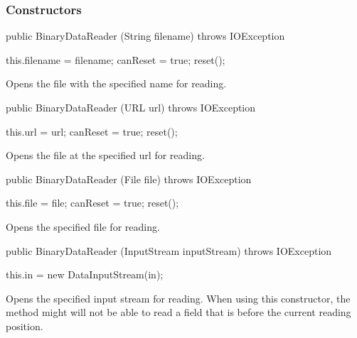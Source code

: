       
\subsubsection*{Constructors}

\begin{code}

   public BinaryDataReader (String filename) throws IOException \begin{hide} {
      this.filename = filename;
      canReset = true;
      reset();
   }
   \end{hide}
\end{code}
\begin{tabb}
Opens the file with the specified name for reading.
\end{tabb}
\begin{htmlonly}
\end{htmlonly}
\begin{code}

   public BinaryDataReader (URL url) throws IOException \begin{hide} {
      this.url = url;
      canReset = true;
      reset();
   }
   \end{hide}
\end{code}
\begin{tabb}
Opens the file at the specified url for reading.
\end{tabb}
\begin{htmlonly}
\end{htmlonly}
\begin{code}

   public BinaryDataReader (File file) throws IOException \begin{hide} {
      this.file = file;
      canReset = true;
      reset();
   }
   \end{hide}
\end{code}
\begin{tabb}
Opens the specified file for reading.
\end{tabb}
\begin{htmlonly}
\end{htmlonly}
\begin{code}
   
   public BinaryDataReader (InputStream inputStream) throws IOException \begin{hide} {
      this.in = new DataInputStream(in);
   }
   \end{hide}
\end{code}
\begin{tabb}
Opens the specified input stream for reading.
When using this constructor, the method  might will not be able to read
a field that is before the current reading position.
\end{tabb}
\begin{htmlonly}
\end{htmlonly}

